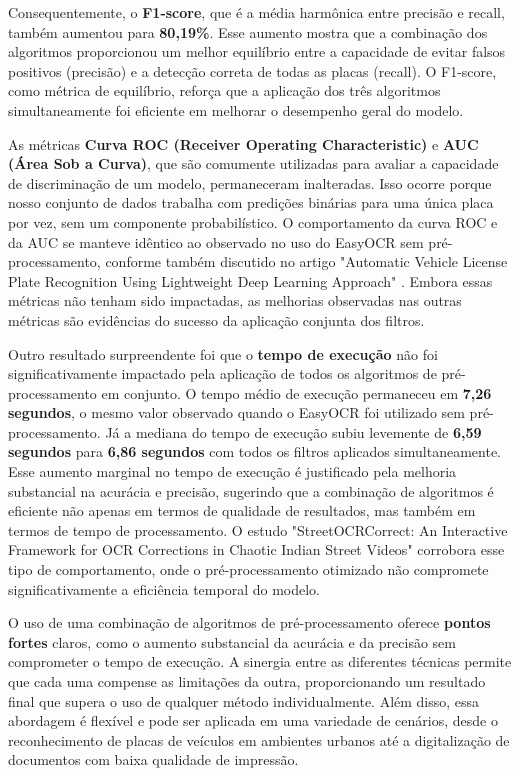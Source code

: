 \documentclass[conference]{IEEEtran}
\begin{document}
Consequentemente, o \textbf{F1-score}, que é a média harmônica entre precisão e recall, também aumentou para \textbf{80,19\%}. Esse aumento mostra que a combinação dos algoritmos proporcionou um melhor equilíbrio entre a capacidade de evitar falsos positivos (precisão) e a detecção correta de todas as placas (recall). O F1-score, como métrica de equilíbrio, reforça que a aplicação dos três algoritmos simultaneamente foi eficiente em melhorar o desempenho geral do modelo.

As métricas \textbf{Curva ROC (Receiver Operating Characteristic)} e \textbf{AUC (Área Sob a Curva)}, que são comumente utilizadas para avaliar a capacidade de discriminação de um modelo, permaneceram inalteradas. Isso ocorre porque nosso conjunto de dados trabalha com predições binárias para uma única placa por vez, sem um componente probabilístico. O comportamento da curva ROC e da AUC se manteve idêntico ao observado no uso do EasyOCR sem pré-processamento, conforme também discutido no artigo "Automatic Vehicle License Plate Recognition Using Lightweight Deep Learning Approach" \cite{b5}. Embora essas métricas não tenham sido impactadas, as melhorias observadas nas outras métricas são evidências do sucesso da aplicação conjunta dos filtros.

Outro resultado surpreendente foi que o \textbf{tempo de execução} não foi significativamente impactado pela aplicação de todos os algoritmos de pré-processamento em conjunto. O tempo médio de execução permaneceu em \textbf{7,26 segundos}, o mesmo valor observado quando o EasyOCR foi utilizado sem pré-processamento. Já a mediana do tempo de execução subiu levemente de \textbf{6,59 segundos} para \textbf{6,86 segundos} com todos os filtros aplicados simultaneamente. Esse aumento marginal no tempo de execução é justificado pela melhoria substancial na acurácia e precisão, sugerindo que a combinação de algoritmos é eficiente não apenas em termos de qualidade de resultados, mas também em termos de tempo de processamento. O estudo "StreetOCRCorrect: An Interactive Framework for OCR Corrections in Chaotic Indian Street Videos" \cite{b13} corrobora esse tipo de comportamento, onde o pré-processamento otimizado não compromete significativamente a eficiência temporal do modelo.

O uso de uma combinação de algoritmos de pré-processamento oferece \textbf{pontos fortes} claros, como o aumento substancial da acurácia e da precisão sem comprometer o tempo de execução. A sinergia entre as diferentes técnicas permite que cada uma compense as limitações da outra, proporcionando um resultado final que supera o uso de qualquer método individualmente. Além disso, essa abordagem é flexível e pode ser aplicada em uma variedade de cenários, desde o reconhecimento de placas de veículos em ambientes urbanos até a digitalização de documentos com baixa qualidade de impressão.
\end{document}
